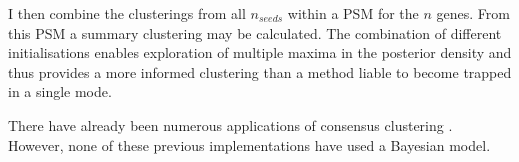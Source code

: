 \documentclass[14pt]{extarticle} %
\begin{document}
	I then combine the clusterings from all $n_{seeds}$ within a PSM for the $n$ genes.  From this PSM a summary clustering may be calculated. The combination of different initialisations enables exploration of multiple maxima in the posterior density and thus provides a more informed clustering than a method liable to become trapped in a single mode. 
	
	
	There have already been numerous applications of consensus clustering \citep{LiWeightedConsensusClustering2008, LancichinettiConsensusclusteringcomplex2012, BreimanRandomForests2001}. However, none of these previous implementations have used a Bayesian model. 
	

\end{document}
